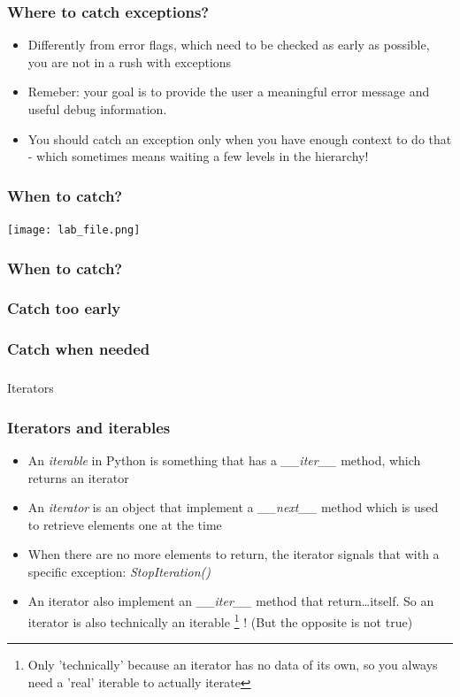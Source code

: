 \documentclass[9pt]{beamer}
\begin{document}
\begin{frame}
  \frametitle{Where to catch exceptions?}
  \begin{itemize}
    \item Differently from error flags, which need to be checked as early as
          possible, you are not in a rush with exceptions
    \item Remeber: your goal is to provide the user a meaningful error message and
          useful debug information.
    \item You should catch an exception only when you have enough context to
          do that - which sometimes means waiting a few levels in the hierarchy!
  \end{itemize}
\end{frame}


\begin{frame}
  \frametitle{When to catch?}
  \centering
  \texttt{[image: lab\_file.png]}
\end{frame}


\begin{frame}
  \frametitle{When to catch?}
  
\end{frame}


\begin{frame}
  \frametitle{Catch too early}
  
\end{frame}


\begin{frame}
  \frametitle{Catch when needed}
  
\end{frame}


\begin{frame}
  \frametitle{}
  \centering \Large Iterators
\end{frame}


\begin{frame}
  \frametitle{Iterators and iterables}
  
  \begin{itemize}
    \item An \emph{iterable} in Python is something that has a \emph{\_\_iter\_\_}
          method, which returns an \alert{iterator}
    \medskip
    \item An \emph{iterator} is an object that implement a \emph{\_\_next\_\_} method
          which is used to retrieve elements one at the time
    \medskip
    \item When there are no more elements to return, the iterator signals that with a specific
          exception: \emph{StopIteration()}
    \medskip
    \item An iterator also implement an \emph{\_\_iter\_\_} method that return\dots itself.
          So an iterator is also technically an iterable%
          \footnote{Only 'technically' because an iterator has no data of its
          own, so you always need a 'real' iterable to actually iterate}%
          ! (But the opposite is not true)
  \end{itemize}
  
\end{frame}
\end{document}
